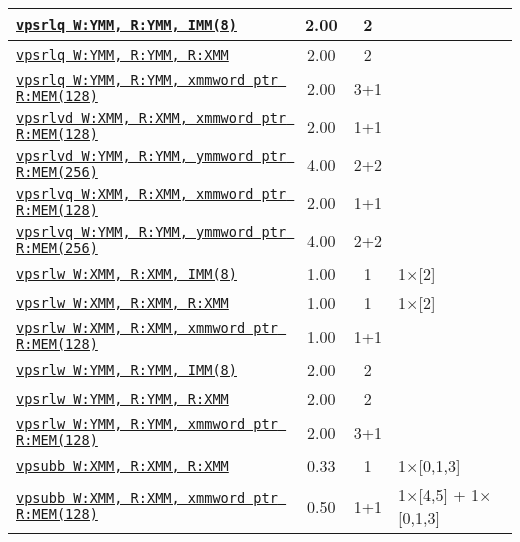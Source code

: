 \documentclass[a4paper,english,fontsize=9]{scrartcl}
\begin{document}
\begin{longtable}{p{}ccL{.25\textwidth}}
  \midrule
  \texttt{\href{https://felixcloutier.com/x86/PSRLW:PSRLD:PSRLQ.html}{vpsrlq W:YMM, R:YMM, IMM(8)}} & 2.00 & 2 &  \\
  \midrule
  \texttt{\href{https://felixcloutier.com/x86/PSRLW:PSRLD:PSRLQ.html}{vpsrlq W:YMM, R:YMM, R:XMM}} & 2.00 & 2 &  \\
  \midrule
  \texttt{\href{https://felixcloutier.com/x86/PSRLW:PSRLD:PSRLQ.html}{vpsrlq W:YMM, R:YMM, xmmword ptr R:MEM(128)}} & 2.00 & 3+1 &  \\
  \midrule
  \texttt{\href{https://felixcloutier.com/x86/VPSRLVW:VPSRLVD:VPSRLVQ.html}{vpsrlvd W:XMM, R:XMM, xmmword ptr R:MEM(128)}} & 2.00 & 1+1 &  \\
  \midrule
  \texttt{\href{https://felixcloutier.com/x86/VPSRLVW:VPSRLVD:VPSRLVQ.html}{vpsrlvd W:YMM, R:YMM, ymmword ptr R:MEM(256)}} & 4.00 & 2+2 &  \\
  \midrule
  \texttt{\href{https://felixcloutier.com/x86/VPSRLVW:VPSRLVD:VPSRLVQ.html}{vpsrlvq W:XMM, R:XMM, xmmword ptr R:MEM(128)}} & 2.00 & 1+1 &  \\
  \midrule
  \texttt{\href{https://felixcloutier.com/x86/VPSRLVW:VPSRLVD:VPSRLVQ.html}{vpsrlvq W:YMM, R:YMM, ymmword ptr R:MEM(256)}} & 4.00 & 2+2 &  \\
  \midrule
  \texttt{\href{https://felixcloutier.com/x86/PSRLW:PSRLD:PSRLQ.html}{vpsrlw W:XMM, R:XMM, IMM(8)}} & 1.00 & 1 & 1\(\times\)[2] \\
  \midrule
  \texttt{\href{https://felixcloutier.com/x86/PSRLW:PSRLD:PSRLQ.html}{vpsrlw W:XMM, R:XMM, R:XMM}} & 1.00 & 1 & 1\(\times\)[2] \\
  \midrule
  \texttt{\href{https://felixcloutier.com/x86/PSRLW:PSRLD:PSRLQ.html}{vpsrlw W:XMM, R:XMM, xmmword ptr R:MEM(128)}} & 1.00 & 1+1 &  \\
  \midrule
  \texttt{\href{https://felixcloutier.com/x86/PSRLW:PSRLD:PSRLQ.html}{vpsrlw W:YMM, R:YMM, IMM(8)}} & 2.00 & 2 &  \\
  \midrule
  \texttt{\href{https://felixcloutier.com/x86/PSRLW:PSRLD:PSRLQ.html}{vpsrlw W:YMM, R:YMM, R:XMM}} & 2.00 & 2 &  \\
  \midrule
  \texttt{\href{https://felixcloutier.com/x86/PSRLW:PSRLD:PSRLQ.html}{vpsrlw W:YMM, R:YMM, xmmword ptr R:MEM(128)}} & 2.00 & 3+1 &  \\
  \midrule
  \texttt{\href{https://felixcloutier.com/x86/PSUBB:PSUBW:PSUBD.html}{vpsubb W:XMM, R:XMM, R:XMM}} & 0.33 & 1 & 1\(\times\)[0,1,3] \\
  \midrule
  \texttt{\href{https://felixcloutier.com/x86/PSUBB:PSUBW:PSUBD.html}{vpsubb W:XMM, R:XMM, xmmword ptr R:MEM(128)}} & 0.50 & 1+1 & 1\(\times\)[4,5] + 1\(\times\)[0,1,3] \\

\end{longtable}
\end{document}
